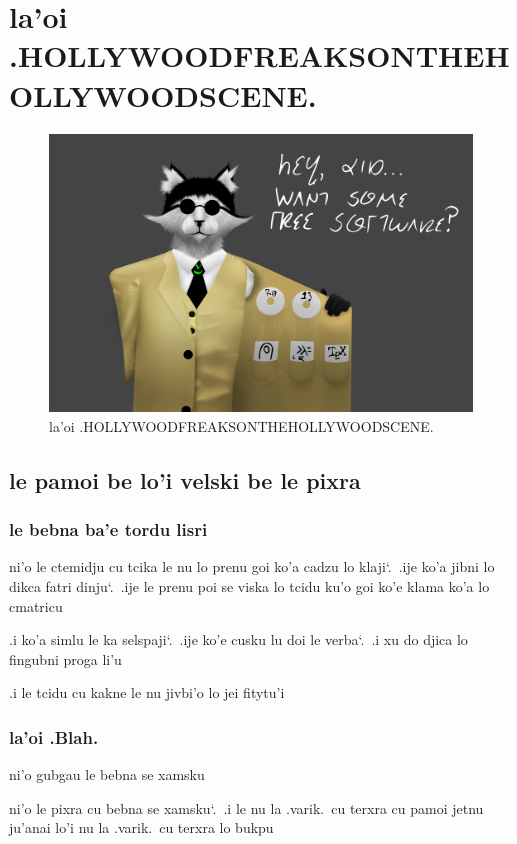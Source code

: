 \documentclass{report}
\newcommand\sds{\spacefactor\sfcode`.\ \space}
\begin{document}
\chapter{la'oi .HOLLYWOODFREAKSONTHEHOLLYWOODSCENE.}
\begin{figure}[ht]
	\centering
	\includegraphics[keepaspectratio, width=\textwidth, height=0.75\textheight]{hollywoodfreaksonthehollywoodscene/hollywoodfreaksonthehollywoodscene.png}
	\caption[center]{la'oi .HOLLYWOODFREAKSONTHEHOLLYWOODSCENE.}
\end{figure}
\section{le pamoi be lo'i velski be le pixra}
\subsection{le bebna ba'e tordu lisri}
ni'o le ctemidju cu tcika le nu lo prenu goi ko'a cadzu lo klaji\sds  .ije ko'a jibni lo dikca fatri dinju\sds  .ije le prenu poi se viska lo tcidu ku'o goi ko'e klama ko'a lo cmatricu

.i ko'a simlu le ka selspaji\sds  .ije ko'e cusku lu doi le verba\sds  .i xu do djica lo fingubni proga li'u

.i le tcidu cu kakne le nu jivbi'o lo jei fitytu'i

\subsection{la'oi .Blah.}
ni'o gubgau le bebna se xamsku

ni'o le pixra cu bebna se xamsku\sds  .i le nu la .varik.\ cu terxra cu pamoi jetnu ju'anai lo'i nu la .varik.\ cu terxra lo bukpu
\end{document}
